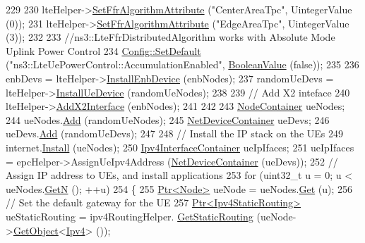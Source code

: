 \begin{DoxyCode}
229 
230   lteHelper->\hyperlink{classns3_1_1LteHelper_a793d56e843a844428851e90752c5f130}{SetFfrAlgorithmAttribute} (\textcolor{stringliteral}{"CenterAreaTpc"}, UintegerValue (0));
231   lteHelper->\hyperlink{classns3_1_1LteHelper_a793d56e843a844428851e90752c5f130}{SetFfrAlgorithmAttribute} (\textcolor{stringliteral}{"EdgeAreaTpc"}, UintegerValue (3));
232 
233   \textcolor{comment}{//ns3::LteFfrDistributedAlgorithm works with Absolute Mode Uplink Power Control}
234   \hyperlink{group__config_ga2e7882df849d8ba4aaad31c934c40c06}{Config::SetDefault} (\textcolor{stringliteral}{"ns3::LteUePowerControl::AccumulationEnabled"}, 
      \hyperlink{classns3_1_1BooleanValue}{BooleanValue} (\textcolor{keyword}{false}));
235 
236   enbDevs = lteHelper->\hyperlink{classns3_1_1LteHelper_a5e009ad35ef85f46b5a6099263f15a03}{InstallEnbDevice} (enbNodes);
237   randomUeDevs = lteHelper->\hyperlink{classns3_1_1LteHelper_ac9cd932d7de92811cfa953c2e3b2fc9f}{InstallUeDevice} (randomUeNodes);
238 
239   \textcolor{comment}{// Add X2 inteface}
240   lteHelper->\hyperlink{classns3_1_1LteHelper_adbbd435f439200097e88a2965668bc26}{AddX2Interface} (enbNodes);
241 
242 
243   \hyperlink{classns3_1_1NodeContainer}{NodeContainer} ueNodes;
244   ueNodes.\hyperlink{classns3_1_1NodeContainer_aa60b3a0e70f2fb324e16ffcf8bf31fcb}{Add} (randomUeNodes);
245   \hyperlink{classns3_1_1NetDeviceContainer}{NetDeviceContainer} ueDevs;
246   ueDevs.\hyperlink{classns3_1_1NetDeviceContainer_a7ca8bc1d7ec00fd4fcc63869987fbda5}{Add} (randomUeDevs);
247 
248   \textcolor{comment}{// Install the IP stack on the UEs}
249   internet.\hyperlink{classns3_1_1InternetStackHelper_a6645b412f31283d2d9bc3d8a95cebbc0}{Install} (ueNodes);
250   \hyperlink{classns3_1_1Ipv4InterfaceContainer}{Ipv4InterfaceContainer} ueIpIfaces;
251   ueIpIfaces = epcHelper->AssignUeIpv4Address (\hyperlink{classns3_1_1NetDeviceContainer}{NetDeviceContainer} (ueDevs));
252   \textcolor{comment}{// Assign IP address to UEs, and install applications}
253   \textcolor{keywordflow}{for} (uint32\_t u = 0; u < ueNodes.\hyperlink{classns3_1_1NodeContainer_aed647ac56d0407a7706aba02eb44b951}{GetN} (); ++u)
254     \{
255       \hyperlink{classns3_1_1Ptr}{Ptr<Node>} ueNode = ueNodes.\hyperlink{classns3_1_1NodeContainer_a9ed96e2ecc22e0f5a3d4842eb9bf90bf}{Get} (u);
256       \textcolor{comment}{// Set the default gateway for the UE}
257       \hyperlink{classns3_1_1Ptr}{Ptr<Ipv4StaticRouting>} ueStaticRouting = ipv4RoutingHelper.
      \hyperlink{classns3_1_1Ipv4StaticRoutingHelper_a731206e50d305695dac7fb2ef963a4bb}{GetStaticRouting} (ueNode->\hyperlink{classns3_1_1Object_a13e18c00017096c8381eb651d5bd0783}{GetObject}<\hyperlink{classns3_1_1Ipv4}{Ipv4}> ());

\end{DoxyCode}
